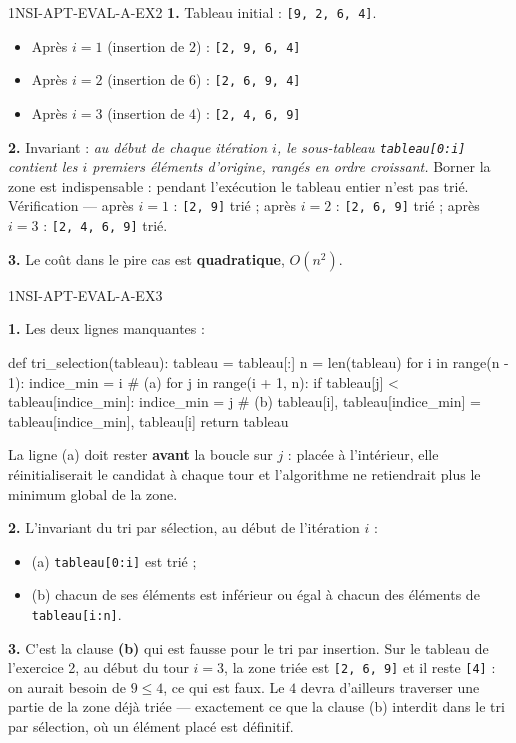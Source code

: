\begin{corrige}{1NSI-APT-EVAL-A-EX2}
\textbf{1.} Tableau initial : \lstinline{[9, 2, 6, 4]}.
\begin{itemize}
  \item Après $i=1$ (insertion de $2$) : \lstinline{[2, 9, 6, 4]}
  \item Après $i=2$ (insertion de $6$) : \lstinline{[2, 6, 9, 4]}
  \item Après $i=3$ (insertion de $4$) : \lstinline{[2, 4, 6, 9]}
\end{itemize}

\textbf{2.} Invariant : \emph{au début de chaque itération $i$, le sous-tableau
\lstinline{tableau[0:i]} contient les $i$ premiers éléments d'origine, rangés en ordre
croissant.} Borner la zone est indispensable : pendant l'exécution le tableau entier n'est
pas trié. Vérification — après $i=1$ : \lstinline{[2, 9]} trié ; après $i=2$ :
\lstinline{[2, 6, 9]} trié ; après $i=3$ : \lstinline{[2, 4, 6, 9]} trié.

\textbf{3.} Le coût dans le pire cas est \textbf{quadratique}, $O(n^2)$.
\end{corrige}

\begin{corrige}{1NSI-APT-EVAL-A-EX3}

\textbf{1.} Les deux lignes manquantes :
\begin{python}
def tri_selection(tableau):
    tableau = tableau[:]
    n = len(tableau)
    for i in range(n - 1):
        indice_min = i                    # (a)
        for j in range(i + 1, n):
            if tableau[j] < tableau[indice_min]:
                indice_min = j            # (b)
        tableau[i], tableau[indice_min] = tableau[indice_min], tableau[i]
    return tableau
\end{python}
La ligne (a) doit rester \textbf{avant} la boucle sur $j$ : placée à l'intérieur, elle
réinitialiserait le candidat à chaque tour et l'algorithme ne retiendrait plus le minimum
global de la zone.

\textbf{2.} L'invariant du tri par sélection, au début de l'itération $i$ :
\begin{itemize}
  \item (a) \lstinline{tableau[0:i]} est trié ;
  \item (b) chacun de ses éléments est inférieur ou égal à chacun des éléments de
    \lstinline{tableau[i:n]}.
\end{itemize}

\textbf{3.} C'est la clause \textbf{(b)} qui est fausse pour le tri par insertion. Sur le
tableau de l'exercice 2, au début du tour $i=3$, la zone triée est \lstinline{[2, 6, 9]} et
il reste \lstinline{[4]} : on aurait besoin de $9 \leqslant 4$, ce qui est faux. Le $4$ devra
d'ailleurs traverser une partie de la zone déjà triée — exactement ce que la clause (b)
interdit dans le tri par sélection, où un élément placé est définitif.

\end{corrige}
